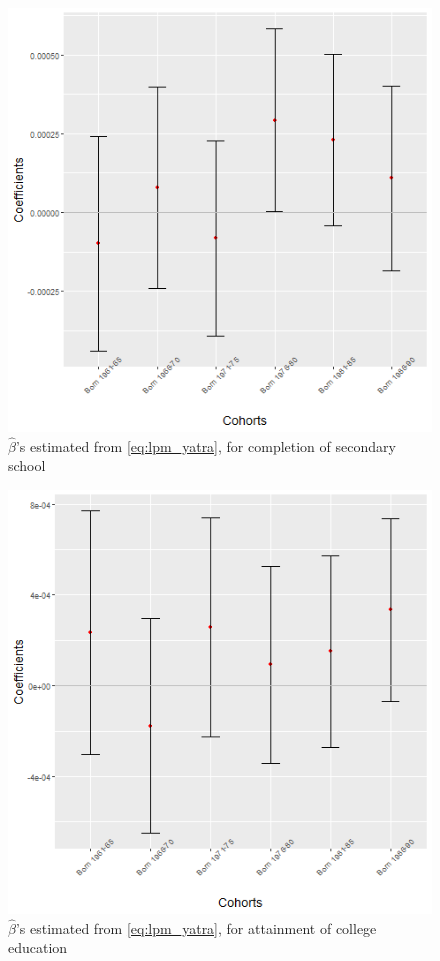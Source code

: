 \documentclass{article}
\begin{document}
\begin{figure}[H]
    \centering
    \includegraphics[scale = 0.5]{images/graph_coeff_sec.png}
    \caption{$\hat{\beta}$'s estimated from \eqref{eq:lpm_yatra}, for completion of secondary school}
    \label{fig:coeff_sec}
\end{figure}

\begin{figure}[H]
    \centering
    \includegraphics[scale = 0.5]{images/graph_coeff_col.png}
    \caption{$\hat{\beta}$'s estimated from \eqref{eq:lpm_yatra}, for attainment of college education}
    \label{fig:coeff_col}
\end{figure}
\end{document}
